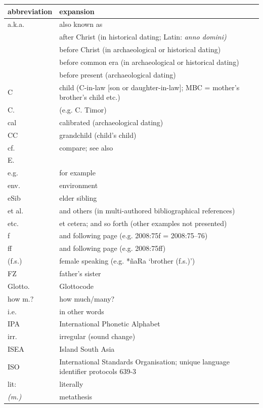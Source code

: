 {\wg
\begin{xltabular}{\textwidth}[l]{l>{\raggedright\arraybackslash}X}
\lsptoprule			
{abbreviation}	&	{expansion}	\\	\midrule
\endhead
a.k.a.	&	also known as	\\
	&	after Christ (in historical dating; Latin: \it{anno domini})	\\
	&	before Christ (in archaeological or historical dating)	\\
	&	before common era (in archaeological or historical dating)	\\
	&	before present (archaeological dating)	\\
C	&	child (C-in-law [son or daughter-in-law]; MBC = mother’s brother’s child etc.)	\\
C.	&	 (e.g. C. Timor)	\\
cal	&	calibrated (archaeological dating)	\\
CC	&	grandchild (child's child)	\\
cf.	&	compare; see also	\\
E.	&		\\
e.g.	&	for example	\\
env.	&	environment	\\
eSib	&	elder sibling	\\
et al.	&	and others (in multi-authored bibliographical references)	\\
etc.	&	et cetera; and so forth (other examples not presented)	\\
f & and following page (e.g. 2008:75f = 2008:75–76) \\
ff & and following page (e.g. 2008:75ff) \\
(f.s.)	&	female speaking (e.g. *ñaRa ‘brother (f.s.)’)	\\
FZ	&	father's sister	\\
Glotto.	&	Glottocode \citep{Hammarstrom2023}	\\
how m.?	&	how much/many?	\\
i.e.	&	in other words	\\
IPA	&	International Phonetic Alphabet	\\
irr.	&	irregular (sound change)	\\
ISEA	&	Island South Asia	\\
ISO	&	International Standards Organisation; unique language identifier protocols 639-3 	\\
lit:	&	literally	\\
\it{(m.)}	&	metathesis	\\

\end{xltabular}}
